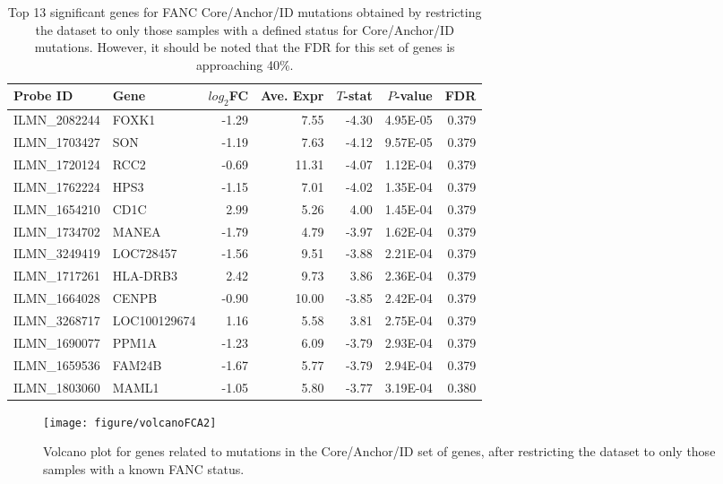 \documentclass{article}\usepackage{knitr}
\begin{document}
\begin{table}[ht]
\centering
\caption{Top 13 significant genes for FANC Core/Anchor/ID mutations obtained by restricting the dataset to only those samples with a defined status for Core/Anchor/ID mutations. However, it should be noted that the FDR for this set of genes is approaching 40\%.} 
\label{tableFCA2}
{\footnotesize
\begin{tabular}{llrrrrr}
  \toprule 
 Probe ID & Gene & $log_2$FC & Ave. Expr & $T$-stat & $P$-value & FDR\\
 \midrule 
 ILMN\_2082244 & FOXK1 & -1.29 & 7.55 & -4.30 & 4.95E-05 & 0.379 \\ 
  ILMN\_1703427 & SON & -1.19 & 7.63 & -4.12 & 9.57E-05 & 0.379 \\ 
  ILMN\_1720124 & RCC2 & -0.69 & 11.31 & -4.07 & 1.12E-04 & 0.379 \\ 
  ILMN\_1762224 & HPS3 & -1.15 & 7.01 & -4.02 & 1.35E-04 & 0.379 \\ 
  ILMN\_1654210 & CD1C & 2.99 & 5.26 & 4.00 & 1.45E-04 & 0.379 \\ 
  ILMN\_1734702 & MANEA & -1.79 & 4.79 & -3.97 & 1.62E-04 & 0.379 \\ 
  ILMN\_3249419 & LOC728457 & -1.56 & 9.51 & -3.88 & 2.21E-04 & 0.379 \\ 
  ILMN\_1717261 & HLA-DRB3 & 2.42 & 9.73 & 3.86 & 2.36E-04 & 0.379 \\ 
  ILMN\_1664028 & CENPB & -0.90 & 10.00 & -3.85 & 2.42E-04 & 0.379 \\ 
  ILMN\_3268717 & LOC100129674 & 1.16 & 5.58 & 3.81 & 2.75E-04 & 0.379 \\ 
  ILMN\_1690077 & PPM1A & -1.23 & 6.09 & -3.79 & 2.93E-04 & 0.379 \\ 
  ILMN\_1659536 & FAM24B & -1.67 & 5.77 & -3.79 & 2.94E-04 & 0.379 \\ 
  ILMN\_1803060 & MAML1 & -1.05 & 5.80 & -3.77 & 3.19E-04 & 0.380 \\ 
   \bottomrule 
\end{tabular}
}
\end{table}

\begin{knitrout}
\color{fgcolor}\begin{figure}[]


{\centering \texttt{[image: figure/volcanoFCA2]} 

}

\caption[Volcano plot for genes related to mutations in the Core/Anchor/ID set of genes, after restricting the dataset to only those samples with a known FANC status]{Volcano plot for genes related to mutations in the Core/Anchor/ID set of genes, after restricting the dataset to only those samples with a known FANC status.\label{fig:volcanoFCA2}}
\end{figure}


\end{knitrout}
\end{document}
